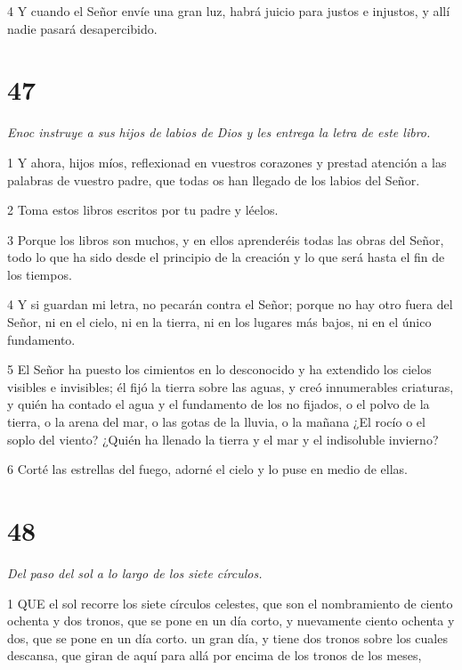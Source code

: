 \par 4 Y cuando el Señor envíe una gran luz, habrá juicio para justos e injustos, y allí nadie pasará desapercibido.

\chapter{47}

\par \textit{Enoc instruye a sus hijos de labios de Dios y les entrega la letra de este libro.}

\par 1 Y ahora, hijos míos, reflexionad en vuestros corazones y prestad atención a las palabras de vuestro padre, que todas os han llegado de los labios del Señor.

\par 2 Toma estos libros escritos por tu padre y léelos.

\par 3 Porque los libros son muchos, y en ellos aprenderéis todas las obras del Señor, todo lo que ha sido desde el principio de la creación y lo que será hasta el fin de los tiempos.

\par 4 Y si guardan mi letra, no pecarán contra el Señor; porque no hay otro fuera del Señor, ni en el cielo, ni en la tierra, ni en los lugares más bajos, ni en el único fundamento.

\par 5 El Señor ha puesto los cimientos en lo desconocido y ha extendido los cielos visibles e invisibles; él fijó la tierra sobre las aguas, y creó innumerables criaturas, y quién ha contado el agua y el fundamento de los no fijados, o el polvo de la tierra, o la arena del mar, o las gotas de la lluvia, o la mañana ¿El rocío o el soplo del viento? ¿Quién ha llenado la tierra y el mar y el indisoluble invierno?

\par 6 Corté las estrellas del fuego, adorné el cielo y lo puse en medio de ellas.

\chapter{48}

\par \textit{Del paso del sol a lo largo de los siete círculos.}

\par 1 QUE el sol recorre los siete círculos celestes, que son el nombramiento de ciento ochenta y dos tronos, que se pone en un día corto, y nuevamente ciento ochenta y dos, que se pone en un día corto. un gran día, y tiene dos tronos sobre los cuales descansa, que giran de aquí para allá por encima de los tronos de los meses,

